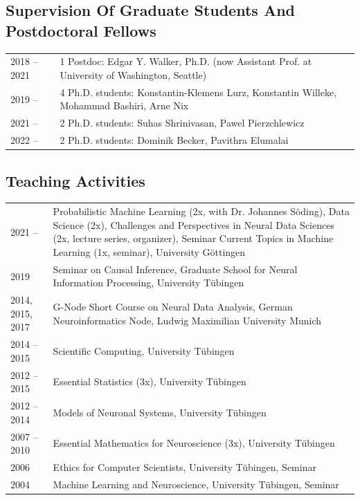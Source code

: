 \documentclass[COG,11pt]{ercgrant}
\begin{document}
\subsection{Supervision Of Graduate Students And Postdoctoral Fellows}
\begin{tabular}{p{3cm}p{12cm}}
2018 -- 2021 & 1 Postdoc: Edgar Y. Walker, Ph.D. (now Assistant Prof. at University of Washington, Seattle)\\
2019 -- & 4 Ph.D. students: Konstantin-Klemens Lurz, Konstantin Willeke, Mohammad Bashiri, Arne Nix\\
2021 -- & 2 Ph.D. students: Suhas Shrinivasan, Pawel Pierzchlewicz\\
2022 -- & 2 Ph.D. students: Dominik Becker, Pavithra Elumalai
\end{tabular}

\subsection{Teaching Activities}
\begin{tabular}{p{3.5cm}p{11.5cm}}
2021 --  & Probabilistic Machine Learning (2x, with Dr. Johannes Söding), Data Science (2x), Challenges and Perspectives in Neural Data Sciences (2x, lecture series, organizer), Seminar Current Topics in Machine Learning (1x, seminar), University Göttingen\\
2019 & Seminar on Causal Inference, Graduate School for Neural Information Processing, University Tübingen \\
2014, 2015, 2017  & G-Node Short Course on Neural Data Analysis, German Neuroinformatics Node, Ludwig Maximilian University Munich\\
2014 -- 2015 &  Scientific Computing, University T\"ubingen\\
2012 -- 2015 & Essential Statistics (3x), University T\"ubingen \\
2012 -- 2014 & Models of Neuronal Systems, University T\"ubingen\\
2007 -- 2010 & Essential Mathematics for Neuroscience (3x), University T\"ubingen\\
2006 & Ethics for Computer Scientists, University T\"ubingen, Seminar\\
2004 & Machine Learning and Neuroscience, University T\"ubingen, Seminar\\ 
\end{tabular}
\end{document}
